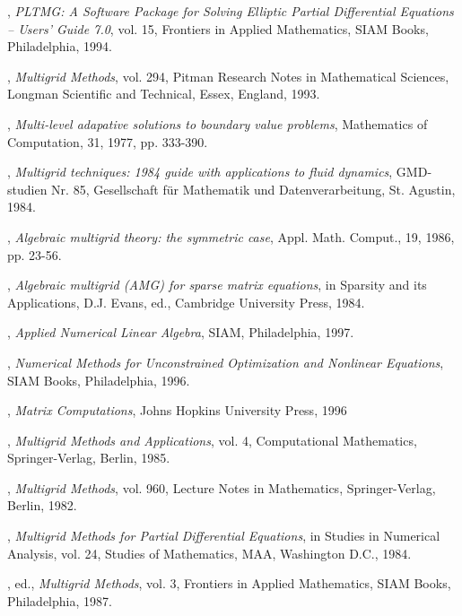 \begin{thebibliography}{99}

, {\em PLTMG: A Software Package for Solving
Elliptic Partial Differential Equations -- Users' Guide 7.0}, vol.
15, Frontiers in Applied Mathematics, SIAM Books, Philadelphia,
1994.

, {\em Multigrid Methods}, vol. 294, Pitman
Research Notes in Mathematical Sciences, Longman Scientific and
Technical, Essex, England, 1993.

, {\em Multi-level adapative solutions to
boundary value problems}, Mathematics of Computation, 31, 1977,
pp. 333-390.

, {\em Multigrid techniques: 1984 guide
with applications to fluid dynamics}, GMD-studien Nr. 85,
Gesellschaft f\"{u}r Mathematik und Datenverarbeitung, St.
Agustin, 1984.

, {\em Algebraic multigrid theory: the symmetric case},
Appl. Math. Comput., 19, 1986, pp. 23-56.

, {\em Algebraic multigrid (AMG) for sparse matrix equations}, in Sparsity and its Applications, D.J. Evans, ed., Cambridge University Press, 1984.

, {\em Applied Numerical Linear Algebra},
SIAM, Philadelphia, 1997.

, {\em Numerical Methods for
Unconstrained Optimization and Nonlinear Equations}, SIAM Books,
Philadelphia, 1996.

, {\em Matrix Computations},
Johns Hopkins University Press, 1996

, {\em Multigrid Methods and Applications},
vol. 4, Computational Mathematics, Springer-Verlag, Berlin, 1985.

, {\em Multigrid Methods},
vol. 960, Lecture Notes in Mathematics, Springer-Verlag, Berlin,
1982.

, {\em Multigrid Methods for Partial
Differential Equations}, in Studies in Numerical Analysis, vol.
24, Studies of Mathematics, MAA, Washington D.C., 1984.

, ed., {\em Multigrid Methods}, vol. 3,
Frontiers in Applied Mathematics, SIAM Books, Philadelphia, 1987.

\end{thebibliography}
